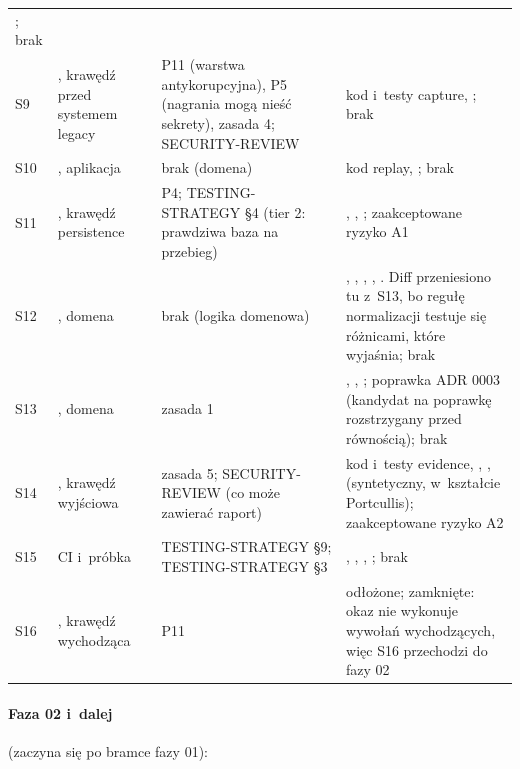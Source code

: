 {\begin{xltabular}{\linewidth}{@{}l >{\raggedright\arraybackslash}p{3.1cm} >{\raggedright\arraybackslash}p{3.4cm} >{\raggedright\arraybackslash}X@{}}
; brak \\
S9 & , krawędź przed systemem legacy & P11 (warstwa
antykorupcyjna), P5 (nagrania mogą nieść sekrety), zasada 4; SECURITY-REVIEW & kod
i~testy capture, ; brak \\
S10 & , aplikacja & brak (domena) & kod replay,
; brak \\
S11 & , krawędź persistence & P4; TESTING-STRATEGY §4 (tier 2:
prawdziwa baza na przebieg) & , ,
; zaakceptowane ryzyko A1 \\
S12 & , domena & brak (logika domenowa) &
, , ,
, . Diff przeniesiono tu z~S13, bo regułę
normalizacji testuje się różnicami, które wyjaśnia; brak \\
S13 & , domena & zasada 1 & ,
, ; poprawka ADR 0003 (kandydat na
poprawkę rozstrzygany przed równością); brak \\
S14 & , krawędź wyjściowa & zasada 5; SECURITY-REVIEW (co
może zawierać raport) & kod i~testy evidence, ,
,  (syntetyczny,
w~kształcie Portcullis); zaakceptowane ryzyko A2 \\
S15 & CI i~próbka & TESTING-STRATEGY §9; TESTING-STRATEGY §3 & ,
, , ; brak \\
S16 & , krawędź wychodząca & P11 & odłożone; zamknięte: okaz nie
wykonuje wywołań wychodzących, więc S16 przechodzi do fazy 02 \\
\end{xltabular}
}

\paragraph{Faza 02 i~dalej} (zaczyna się po bramce fazy 01):

